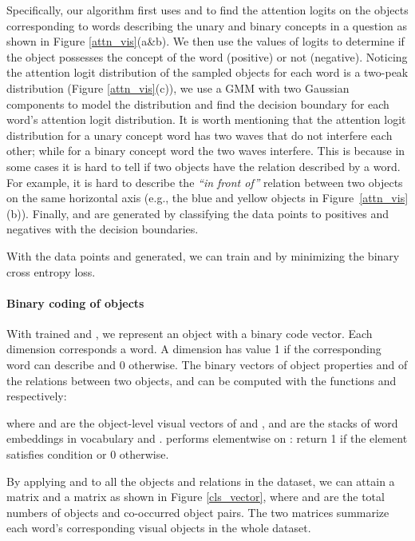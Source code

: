 \documentclass[final]{cvpr}
\begin{document}
Specifically, our algorithm first uses  and  to find the attention logits on the objects corresponding to words describing the unary and binary concepts in a question as shown in Figure \ref{attn_vis}(a\&b). 
We then use the values of logits to determine if the object possesses the concept of the word (positive) or not (negative).
Noticing the attention logit distribution of the sampled objects for each word is a two-peak distribution (Figure \ref{attn_vis}(c)), we use a GMM \cite{xuan2001algorithms} with two Gaussian components to model the distribution and find the decision boundary for each word's attention logit distribution. It is worth mentioning that the attention logit distribution for a unary concept word has two waves that do not interfere each other; while for a binary concept word the two waves interfere. 
This is because in some cases it is hard to tell if two objects have the relation described by a word. For example, it is hard to describe the \emph{``in front of''} relation between two objects on the same horizontal axis (e.g., the blue and yellow objects in Figure~\ref{attn_vis}(b)). Finally,  and  are generated by classifying the data points to positives and negatives with the decision boundaries. 

With the data points  and  generated, we can train  and  by minimizing the binary cross entropy loss.




\vspace{-3mm}
\paragraph{Binary coding of objects}
With trained  and , we represent an object  with a binary code vector. Each dimension corresponds a word. A dimension has value 1 if the corresponding word can describe  and 0 otherwise. The binary vectors of object properties and of the relations between two objects,  and  can be computed with the functions  and  respectively:

where  and  are the object-level visual vectors of  and ,  and  are the stacks of word embeddings in vocabulary  and .  performs elementwise on : return 1 if the element satisfies condition  or 0 otherwise. 

By applying  and  to all the objects and relations in the dataset, we can attain a matrix  and a matrix  as shown in Figure \ref{cls_vector}, where  and  are the total numbers of objects and co-occurred object pairs. The two matrices summarize each word's corresponding visual objects in the whole dataset.
\end{document}
